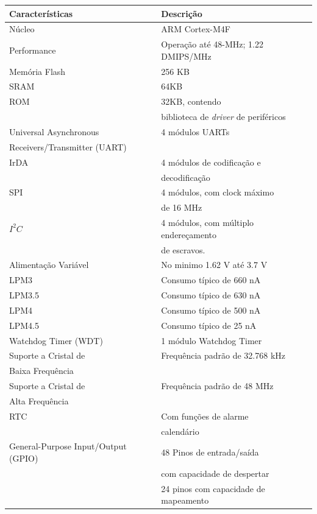 \begin{longtable}{|l|l|}
	\hline
	\cellcolor[HTML]{343434} \color[HTML]{FFFFFF} Características & \cellcolor[HTML]{343434} \color[HTML]{FFFFFF} Descrição \\
	\hline
	Núcleo 			& ARM Cortex-M4F\\
	\hline
	Performance 	& Operação até 48-MHz; 1.22 DMIPS/MHz \\
	\hline
	Memória Flash 	& 256 KB  \\
	\hline
	SRAM 			& 64KB \\
	\hline
	ROM 			&  32KB,  contendo\\
					& biblioteca de \emph{driver} de periféricos\\
	Universal Asynchronous  & 4 módulos UARTs \\
	Receivers/Transmitter (UART) & \\
	\hline
	IrDA 			& 4 módulos de codificação e\\
					& decodificação \\
	\hline
	SPI 			& 4 módulos, com clock máximo\\
					& de 16 MHz\\
	\hline
	$I^2C$ 			& 4 módulos, com múltiplo endereçamento \\
					& de escravos.\\
	\hline
	Alimentação Variável &  No minimo 1.62 V até 3.7 V\\ 
	\hline
	LPM3                 & Consumo típico de 660 nA \\
	\hline
	LPM3.5               & Consumo típico de 630 nA \\
	\hline
	LPM4                 & Consumo típico de 500 nA \\
	\hline
	LPM4.5               & Consumo típico de 25 nA \\
	\hline
	Watchdog Timer (WDT) & 1 módulo Watchdog Timer \\
	\hline
	Suporte a Cristal de & Frequência padrão de 32.768 kHz \\
	Baixa Frequência     &                         \\
	\hline
	Suporte a Cristal de & Frequência padrão de 48 MHz \\
	Alta Frequência      &                         \\
	\hline
	RTC                  & Com funções de alarme  \\
	                     & calendário             \\
	\hline
	General-Purpose Input/Output (GPIO) & 48 Pinos de entrada/saída\\
	                                    & com capacidade de despertar \\
	                                    & 24 pinos com capacidade de mapeamento\\
		

\end{longtable}
